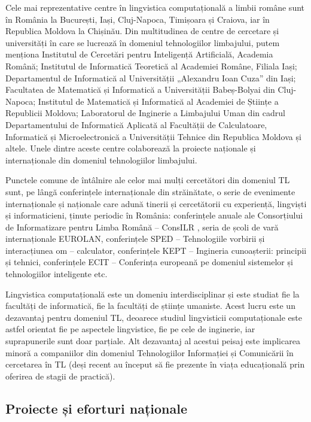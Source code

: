 \begin{multicols}{2}
Cele mai reprezentative centre în lingvistica computațională a limbii române sunt în România la București, Iași, Cluj-Napoca, Timișoara și Craiova, iar în Republica Moldova la Chișinău. Din multitudinea de centre de cercetare și universități în care se lucrează în domeniul tehnologiilor limbajului, putem menționa Institutul de Cercetări pentru Inteligență Artificială, Academia Română; Institutul de Informatică Teoretică al Academiei Române, Filiala Iași; Departamentul de Informatică al Universității „Alexandru Ioan Cuza” din Iași; Facultatea de Matematică și Informatică a Universității Babeș-Bolyai din Cluj-Napoca; Institutul de Matematică și Informatică al Academiei de Științe a Republicii Moldova; Laboratorul de Inginerie a Limbajului Uman din cadrul Departamentului de Informatică Aplicată al Facultății de Calculatoare, Informatică și Microelectronică a Universității Tehnice din Republica Moldova și altele. Unele dintre aceste centre colaborează la proiecte naționale și internaționale din domeniul tehnologiilor limbajului. 

Punctele comune de întâlnire ale celor mai mulți cercetători din domeniul TL sunt, pe lângă conferințele internaționale din străinătate, o serie de evenimente internaționale și naționale care adună tinerii și cercetătorii cu experiență, lingviști și informaticieni, ținute periodic în România: conferințele anuale ale Consorțiului de Informatizare pentru Limba Română -- ConsILR \cite{consilr}, seria de școli de vară internaționale EUROLAN, conferințele SPED -- Tehnologiile vorbirii și interacțiunea om -- calculator, conferințele KEPT -- Ingineria cunoașterii: principii și tehnici, conferințele ECIT -- Conferința europeană pe domeniul sistemelor și tehnologiilor inteligente etc.

Lingvistica computațională este un domeniu interdisciplinar și este studiat fie la facultăți de informatică, fie la facultăți de științe umaniste. Acest lucru este un dezavantaj pentru domeniul TL, deoarece studiul lingvisticii computaționale este astfel orientat fie pe aspectele lingvistice, fie pe cele de inginerie, iar suprapunerile sunt doar parțiale. Alt dezavantaj al acestui peisaj este implicarea minoră a companiilor din domeniul Tehnologiilor Informației și Comunicării în cercetarea în TL (deși recent au început să fie prezente în viața educațională prin oferirea de stagii de practică). \vspace*{0.009 cm}

\subsection{Proiecte și eforturi naționale}


\end{multicols}
